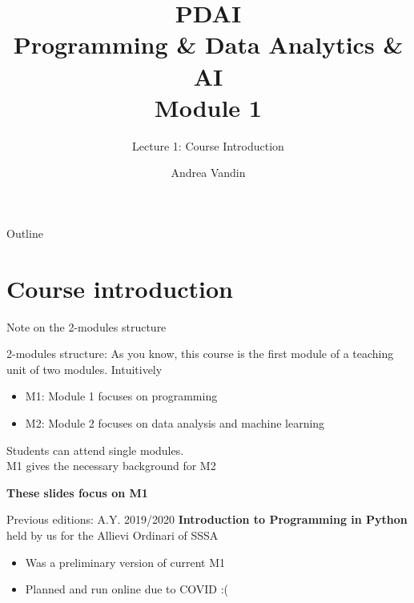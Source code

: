 \documentclass{beamer}%
\title{PDAI\\ Programming \& Data Analytics \& AI \\ Module 1
}
\subtitle{Lecture 1: Course Introduction}
\date{%
}
\begin{document}
\frame{\titlepage}
\author{Andrea Vandin}


\begin{frame}{Outline}
\tableofcontents
\end{frame}

\section{Course introduction}

\begin{frame}{Note on the 2-modules structure}
	\begin{block}{2-modules structure: \myurl{\homepage}}
		As you know, this course is the first module of a teaching unit of two modules. Intuitively
		\begin{itemize}
			\item M1: Module 1 focuses on programming
			\item M2: Module 2 focuses  on data analysis and machine learning
		\end{itemize}
		Students can attend single modules. \\ M1 gives the necessary background for M2
		\begin{center}\textbf{These slides focus on M1}\end{center}
	\end{block}	
\pause
	\begin{block}{Previous editions: A.Y. 2019/2020}
		\textbf{Introduction to Programming in Python} held by us 
		for the Allievi Ordinari of SSSA
		\begin{itemize}
			\item Was a preliminary version of current M1
			\item Planned and run online due to COVID :(
		\end{itemize}
	\end{block}
\end{frame}
\end{document}
